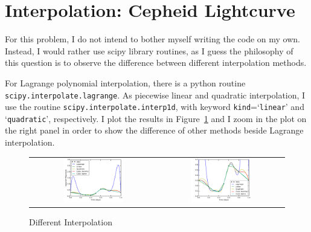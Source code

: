 \documentclass[11pt,letterpaper]{article}
\begin{document}
\section{Interpolation: Cepheid Lightcurve}
For this problem, I do not intend to bother myself writing the code on my own. Instead, I would rather use scipy library routines, as I guess the philosophy of this question is to observe the difference between different interpolation methods. 

For Lagrange polynomial interpolation, there is a python routine {\tt scipy.interpolate.lagrange}. As piecewise linear and quadratic interpolation, I use the routine {\tt scipy.interpolate.interp1d}, with keyword {\tt kind}=`{\tt linear}' and `{\tt quadratic}', respectively. I plot the results in Figure~\ref{fig2} and I zoom in the plot on the right panel in order to show the difference of other methods beside Lagrange interpolation. 

\begin{figure}
\centering
\begin{tabular}{cc}
    \includegraphics[width={0.49\textwidth}]{fig3.pdf} &
    \includegraphics[width={0.49\textwidth}]{fig4.pdf} \\
\end{tabular}
\caption{Different Interpolation}
\label{fig2}
\end{figure}
\end{document}
